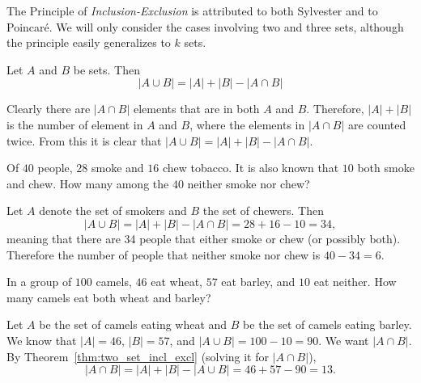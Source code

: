 The Principle of {\em Inclusion-Exclusion} is attributed to both
Sylvester and to Poincar\'{e}.  We will only consider the cases involving
two and three sets, although the principle easily generalizes to $k$ sets.

\begin{thm}
\label{thm:two_set_incl_excl}
Let $A$ and $B$ be sets.  Then 
$$|A \cup B| = |A| + |B| - |A \cap B|$$

\begin{pf}
Clearly there are $|A\cap B|$ elements that are in both $A$ and $B$.
Therefore, $|A|+|B|$ is the number of element in $A$ and $B$, where
the elements in $|A\cap B|$ are counted twice.  From this it is clear
that $|A \cup B| = |A| + |B| - |A \cap B|$.
\end{pf}
\end{thm}
%

\begin{exa}\label{exa:incl_excl_1}
Of  $40$ people, $28$ smoke and  $16$ chew tobacco. It is also known
that  $10$ both smoke and chew. How many among the $40$ neither
smoke nor chew?  
\begin{sol} Let $A$
denote the set of smokers and $B$ the set of chewers. Then
$$|A \cup B| = |A| + |B| - |A \cap B| = 28 + 16 - 10 = 34,$$
meaning that there are 34 people that either smoke or chew (or
possibly both). Therefore the number of people that neither smoke
nor chew is $40 - 34 = 6.$
\end{sol}
\end{exa}



\begin{exer}
In a group of $100$ camels, $46$ eat wheat, $57$ eat barley, and
$10$ eat neither. How many camels eat both wheat and barley?
\vspace*{3in}
\begin{answer} 
Let $A$ be the set of camels eating wheat and $B$ be the set of camels eating barley.
We know that $|A|=46$, $|B|=57$, and $|A\cup B|=100-10=90$.
We want $|A\cap B|$.  By Theorem~\ref{thm:two_set_incl_excl} (solving it for $|A\cap B|$),
$$|A\cap B| = |A|+|B|-|A \cup B| = 46+57-90=13.$$
\end{answer}
\end{exer}

